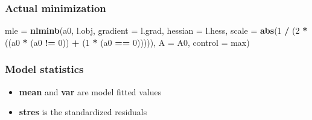 \documentclass[]{article}
\newenvironment{Shaded}{\begin{snugshade}}{\end{snugshade}}
\newcommand{\DataTypeTok}[1]{\textcolor[rgb]{0.13,0.29,0.53}{#1}}
\newcommand{\DecValTok}[1]{\textcolor[rgb]{0.00,0.00,0.81}{#1}}
\newcommand{\KeywordTok}[1]{\textcolor[rgb]{0.13,0.29,0.53}{\textbf{#1}}}
\newcommand{\NormalTok}[1]{#1}
\newcommand{\OperatorTok}[1]{\textcolor[rgb]{0.81,0.36,0.00}{\textbf{#1}}}
\newcommand{\StringTok}[1]{\textcolor[rgb]{0.31,0.60,0.02}{#1}}
\providecommand{\tightlist}{%
  \setlength{\itemsep}{0pt}\setlength{\parskip}{0pt}}
\begin{document}
\hypertarget{actual-minimization}{%
\subsubsection{Actual minimization}\label{actual-minimization}}

\begin{Shaded}
\begin{Highlighting}[]
\NormalTok{mle =}\StringTok{ }\KeywordTok{nlminb}\NormalTok{(a0, l.obj, }\DataTypeTok{gradient =}\NormalTok{ l.grad, }\DataTypeTok{hessian =}\NormalTok{ l.hess, }
             \DataTypeTok{scale =} \KeywordTok{abs}\NormalTok{(}\DecValTok{1} \OperatorTok{/}\StringTok{ }\NormalTok{(}\DecValTok{2} \OperatorTok{*}\StringTok{ }\NormalTok{((a0 }\OperatorTok{*}\StringTok{ }\NormalTok{(a0 }\OperatorTok{!=}\StringTok{ }\DecValTok{0}\NormalTok{)) }\OperatorTok{+}\StringTok{ }\NormalTok{(}\DecValTok{1} \OperatorTok{*}\StringTok{ }\NormalTok{(a0 }\OperatorTok{==}\StringTok{ }\DecValTok{0}\NormalTok{))))),}
             \DataTypeTok{A =}\NormalTok{ A0, }\DataTypeTok{control =}\NormalTok{ max)}
\end{Highlighting}
\end{Shaded}

\hypertarget{model-statistics}{%
\subsubsection{Model statistics}\label{model-statistics}}

\begin{itemize}
\tightlist
\item
  \textbf{mean} and \textbf{var} are model fitted values
\item
  \textbf{stres} is the standardized residuals
\end{itemize}
\end{document}
